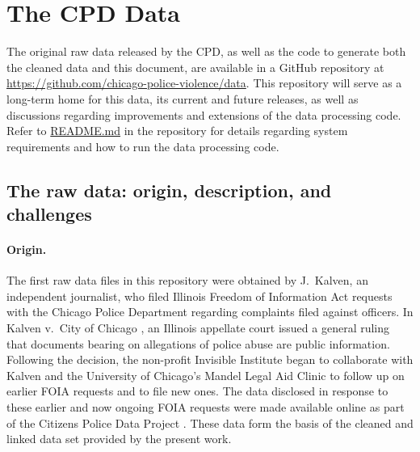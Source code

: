 \section{The CPD Data} \label{sec:data}

The original raw data released by the CPD, as well as the code to generate both the
cleaned data and this document, are available in a GitHub
repository at \url{https://github.com/chicago-police-violence/data}. This
repository will serve as a long-term home for this data, its current and future
releases, as well as discussions regarding improvements and extensions of the
data processing code. Refer to \url{README.md} in the repository for
details regarding system requirements and how to run the data processing code. 

\subsection{The raw data: origin, description, and challenges}
\label{sec:raw}

\paragraph{Origin.}
The first raw data files in this repository were obtained by J.~Kalven, an 
independent journalist, who filed Illinois Freedom of Information Act requests with 
the Chicago Police Department regarding complaints filed against officers. 
In Kalven v.~City of Chicago \cite{kalven2014}, an Illinois appellate court issued
a general ruling that documents bearing on allegations of
police abuse are public information. Following 
the decision, the non-profit
Invisible Institute began to collaborate with Kalven 
and the University of Chicago's Mandel Legal Aid
Clinic to follow up on earlier FOIA requests and to file new ones. The data
disclosed in response to these earlier and now ongoing FOIA requests were made available
online as part of the Citizens Police Data Project \cite{cpdp}.
These data form the basis of the cleaned and linked data set provided by the present work.

